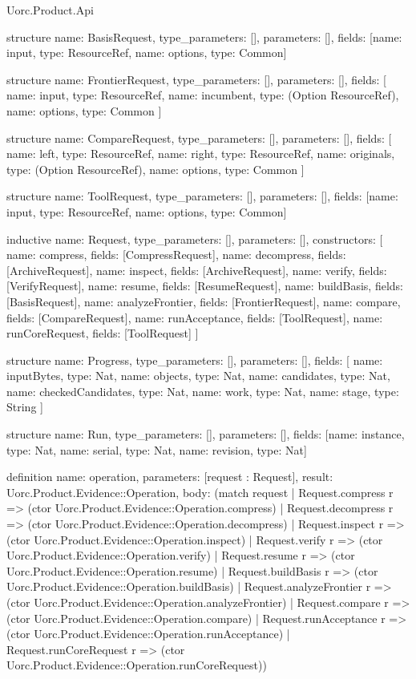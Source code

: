 \begin{lexlean}{Uorc.Product.Api}
\begin{semanticmodule}
structure{
  name: BasisRequest,
  type_parameters: [],
  parameters: [],
  fields: [{name: input, type: ResourceRef}, {name: options, type: Common}]
}

structure{
  name: FrontierRequest,
  type_parameters: [],
  parameters: [],
  fields: [
    {name: input, type: ResourceRef},
    {name: incumbent, type: (Option ResourceRef)},
    {name: options, type: Common}
  ]
}

structure{
  name: CompareRequest,
  type_parameters: [],
  parameters: [],
  fields: [
    {name: left, type: ResourceRef},
    {name: right, type: ResourceRef},
    {name: originals, type: (Option ResourceRef)},
    {name: options, type: Common}
  ]
}

structure{
  name: ToolRequest,
  type_parameters: [],
  parameters: [],
  fields: [{name: input, type: ResourceRef}, {name: options, type: Common}]
}

inductive{
  name: Request,
  type_parameters: [],
  parameters: [],
  constructors: [
    {name: compress, fields: [CompressRequest]},
    {name: decompress, fields: [ArchiveRequest]},
    {name: inspect, fields: [ArchiveRequest]},
    {name: verify, fields: [VerifyRequest]},
    {name: resume, fields: [ResumeRequest]},
    {name: buildBasis, fields: [BasisRequest]},
    {name: analyzeFrontier, fields: [FrontierRequest]},
    {name: compare, fields: [CompareRequest]},
    {name: runAcceptance, fields: [ToolRequest]},
    {name: runCoreRequest, fields: [ToolRequest]}
  ]
}

structure{
  name: Progress,
  type_parameters: [],
  parameters: [],
  fields: [
    {name: inputBytes, type: Nat},
    {name: objects, type: Nat},
    {name: candidates, type: Nat},
    {name: checkedCandidates, type: Nat},
    {name: work, type: Nat},
    {name: stage, type: String}
  ]
}

structure{
  name: Run,
  type_parameters: [],
  parameters: [],
  fields: [{name: instance, type: Nat}, {name: serial, type: Nat}, {name: revision, type: Nat}]
}

definition{
  name: operation,
  parameters: [request : Request],
  result: Uorc.Product.Evidence::Operation,
  body: (match request
    | Request.compress r => (ctor Uorc.Product.Evidence::Operation.compress)
    | Request.decompress r => (ctor Uorc.Product.Evidence::Operation.decompress)
    | Request.inspect r => (ctor Uorc.Product.Evidence::Operation.inspect)
    | Request.verify r => (ctor Uorc.Product.Evidence::Operation.verify)
    | Request.resume r => (ctor Uorc.Product.Evidence::Operation.resume)
    | Request.buildBasis r => (ctor Uorc.Product.Evidence::Operation.buildBasis)
    | Request.analyzeFrontier r => (ctor Uorc.Product.Evidence::Operation.analyzeFrontier)
    | Request.compare r => (ctor Uorc.Product.Evidence::Operation.compare)
    | Request.runAcceptance r => (ctor Uorc.Product.Evidence::Operation.runAcceptance)
    | Request.runCoreRequest r => (ctor Uorc.Product.Evidence::Operation.runCoreRequest))
}


\end{semanticmodule}
\end{lexlean}
